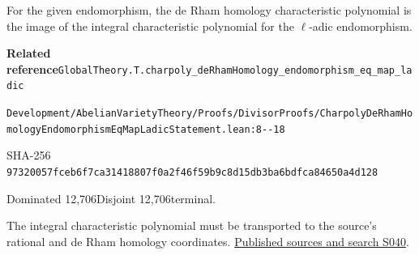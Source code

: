 
\begin{formalstatement}[D174]\label{decomp:D174}
For the given endomorphism, the de Rham homology characteristic polynomial is the image of the integral characteristic polynomial for the \ensuremath{\ell}-adic endomorphism.
\end{formalstatement}
{\small\raggedright\noindent\textsf{\bfseries Related reference}\quad \nolinkurl{GlobalTheory.T.charpoly_deRhamHomology_endomorphism_eq_map_ladic}\par\noindent \nolinkurl{Development/AbelianVarietyTheory/Proofs/DivisorProofs/CharpolyDeRhamHomologyEndomorphismEqMapLadicStatement.lean:8--18}\par\noindent SHA-256 \nolinkurl{97320057fceb6f7ca31418807f0a2f46f59b9c8d15db3ba6bdfca84650a4d128}\par\noindent Dominated 12,706\quad Disjoint 12,706\quad terminal.\par}
The integral characteristic polynomial must be transported to the source’s rational and de Rham homology coordinates.
\hyperref[lit:S040]{Published sources and search S040}.
